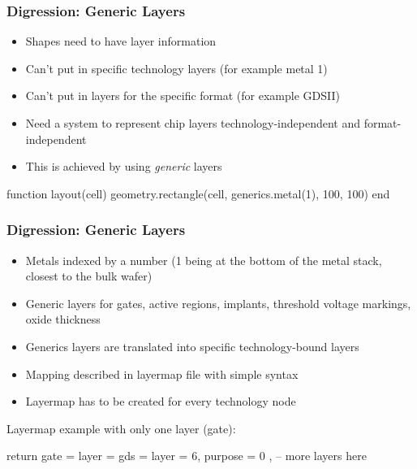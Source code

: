 \documentclass[aspectratio=169, dvipsnames, x11names, svgnames, 11pt]{beamer}
\begin{document}
\begin{frame}[fragile]
    \centering
    \frametitle{Digression: Generic Layers}
    \begin{itemize}
        \item Shapes need to have layer information
        \item Can't put in specific technology layers (for example metal 1)
        \item Can't put in layers for the specific format (for example GDSII)
        \item Need a system to represent chip layers technology-independent and format-independent
        \item This is achieved by using \emph{generic} layers
    \end{itemize}
    \vfill
    \begin{luacode}
        function layout(cell)
            geometry.rectangle(cell, generics.metal(1), 100, 100)
        end
    \end{luacode}
\end{frame}

\begin{frame}[fragile]
    \centering
    \frametitle{Digression: Generic Layers}
    \begin{itemize}
        \item Metals indexed by a number (1 being at the bottom of the metal stack, closest to the bulk wafer)
        \item Generic layers for gates, active regions, implants, threshold voltage markings, oxide thickness
        \item Generics layers are translated into specific technology-bound layers
        \item Mapping described in layermap file with simple syntax
        \item Layermap has to be created for every technology node
    \end{itemize}
    \vfill
    Layermap example with only one layer (gate):
    \begin{luacode}
        return {
            gate = { layer = { gds = { layer = 6, purpose = 0 } } },
            -- more layers here
        }
    \end{luacode}
\end{frame}
\end{document}
